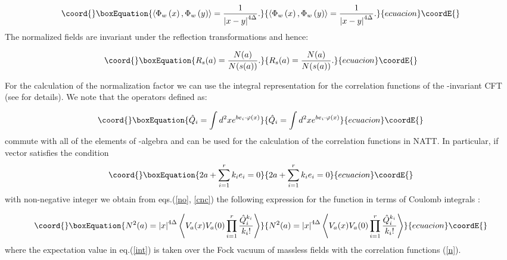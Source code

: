 \documentclass[a4paper,12pt]{article}
\begin{document}
\begin{equation}\coord{}\boxEquation{
\left\langle \Phi _w\left( x\right) ,\Phi _w\left( y\right) \right\rangle =
\frac 1{\left| x-y\right| ^{4\Delta }}.  \label{cnc}
}{
\left\langle \Phi _w\left( x\right) ,\Phi _w\left( y\right) \right\rangle =
\frac 1{\left| x-y\right| ^{4\Delta }}.  }{ecuacion}\coordE{}\end{equation}
The normalized fields \coordHE{} are invariant under the reflection
transformations and hence:

\begin{equation}\coord{}\boxEquation{
R_s(a)=\frac{N(a)}{N(s(a))}.  \label{rnr}
}{
R_s(a)=\frac{N(a)}{N(s(a))}.  }{ecuacion}\coordE{}\end{equation}

For the calculation of the normalization factor \coordHE{} we can use the
integral representation for the correlation functions of the \coordHE{}
-invariant CFT (see \cite{FL} for details). We note that the operators \coordHE{} defined as:

\begin{equation}\coord{}\boxEquation{
\hat{Q}_i=\int d^2xe^{be_i\cdot \varphi (x)}  \label{sc}
}{
\hat{Q}_i=\int d^2xe^{be_i\cdot \varphi (x)}  }{ecuacion}\coordE{}\end{equation}
commute with all of the elements of \coordHE{}-algebra and can be used for the
calculation of the correlation functions in NATT. In particular, if vector 
\coordHE{} satisfies the condition 
\begin{equation}\coord{}\boxEquation{
2a+\sum_{i=1}^rk_ie_i=0  \label{con}
}{
2a+\sum_{i=1}^rk_ie_i=0  }{ecuacion}\coordE{}\end{equation}
with non-negative integer \coordHE{} we obtain from eqs.(\ref{no}, \ref{cnc}) the
following expression for the function \coordHE{} in terms of Coulomb integrals 
\cite{FL}:

\begin{equation}\coord{}\boxEquation{
N^2(a)=\left| x\right| ^{4\Delta }\left\langle V_a(x)V_a(0)\prod_{i=1}^r
\frac{\hat{Q}_i^{k_i}}{k_i!}\right\rangle  \label{int}
}{
N^2(a)=\left| x\right| ^{4\Delta }\left\langle V_a(x)V_a(0)\prod_{i=1}^r
\frac{\hat{Q}_i^{k_i}}{k_i!}\right\rangle  }{ecuacion}\coordE{}\end{equation}
where the expectation value in eq.(\ref{int}) is taken over the Fock vacuum
of massless fields \myHighlight{$\varphi $}\coordHE{} with the correlation functions (\ref{n}).
\end{document}
